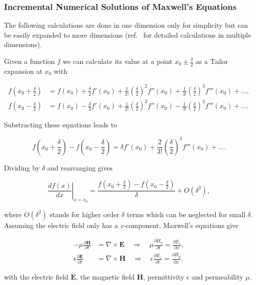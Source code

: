 \subsubsection{Incremental Numerical Solutions of Maxwell's Equations}

The following calculations are done in one dimension only for simplicity but can be easily expanded to more dimensions (ref.~\cite{numel} for detailed calculations in multiple dimensions).

Given a function $f$ we can calculate its value at a point $x_0\pm\frac{\delta}{2}$ as a Tailor expansion at $x_0$ with

\begin{align}
  f\left(x_0+\frac{\delta}{2}\right)&=f(x_0)+\frac{\delta}{2}f'(x_0)+\frac{1}{2!}\left(\frac{\delta}{2}\right)^2f''(x_0)+\frac{1}{3!}\left(\frac{\delta}{2}\right)^3f'''(x_0)+\dots,\\
  f\left(x_0-\frac{\delta}{2}\right)&=f(x_0)-\frac{\delta}{2}f'(x_0)+\frac{1}{2!}\left(\frac{\delta}{2}\right)^2f''(x_0)-\frac{1}{3!}\left(\frac{\delta}{2}\right)^3f'''(x_0)+\dots.
\end{align}

Substracting these equations leads to

\begin{equation}
  f\left(x_0+\frac{\delta}{2}\right)-f\left(x_0-\frac{\delta}{2}\right)=\delta f'(x_0)+\frac{2}{3!}\left(\frac{\delta}{2}\right)^3f'''(x_0)+\dots.
\end{equation}

Dividing by $\delta$ and rearranging gives

\begin{equation}
  \left.\frac{df(x)}{dx}\right|_{x=x_0} = \frac{f(x_0+\frac{\delta}{2})-f(x_0-\frac{\delta}{2})}{\delta} + O(\delta^2),
\end{equation}

where $O(\delta^2)$ stands for higher order $\delta$ terms which can be neglected for small $\delta$. Assuming the electric field only has a $z$-component, Maxwell's equations give

\begin{align}
  -\mu\frac{\partial\mathbf{H}}{\partial t}&=\nabla\times\mathbf{E} \quad\Rightarrow\quad \mu\frac{\partial H_y}{\partial t} = \frac{\partial E_z}{\partial x},\\ \label{eq:maxwell}
  \epsilon\frac{\partial\mathbf{E}}{\partial t}&=\nabla\times\mathbf{H} \quad\Rightarrow\quad \epsilon\frac{\partial E_z}{\partial t} = \frac{\partial H_y}{\partial x},
\end{align}

with the electric field $\mathbf{E}$, the magnetic field $\mathbf{H}$, permittivity $\epsilon$ and permeability $\mu$.
